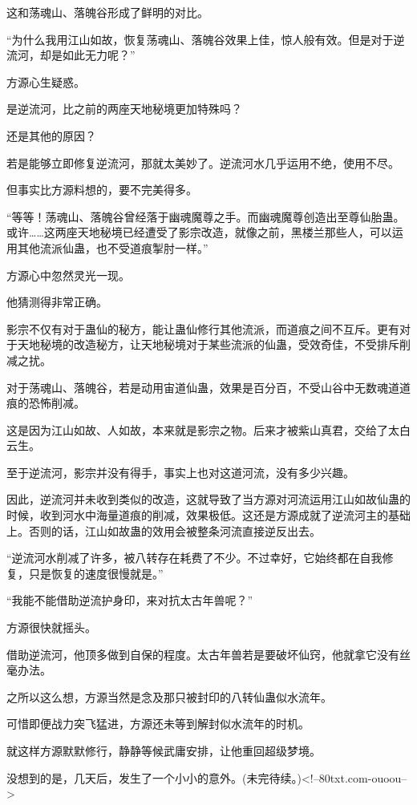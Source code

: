 \begin{this_body}
这和荡魂山、落魄谷形成了鲜明的对比。

“为什么我用江山如故，恢复荡魂山、落魄谷效果上佳，惊人般有效。但是对于逆流河，却是如此无力呢？”

方源心生疑惑。

是逆流河，比之前的两座天地秘境更加特殊吗？

还是其他的原因？

若是能够立即修复逆流河，那就太美妙了。逆流河水几乎运用不绝，使用不尽。

但事实比方源料想的，要不完美得多。

“等等！荡魂山、落魄谷曾经落于幽魂魔尊之手。而幽魂魔尊创造出至尊仙胎蛊。或许……这两座天地秘境已经遭受了影宗改造，就像之前，黑楼兰那些人，可以运用其他流派仙蛊，也不受道痕掣肘一样。”

方源心中忽然灵光一现。

他猜测得非常正确。

影宗不仅有对于蛊仙的秘方，能让蛊仙修行其他流派，而道痕之间不互斥。更有对于天地秘境的改造秘方，让天地秘境对于某些流派的仙蛊，受效奇佳，不受排斥削减之扰。

对于荡魂山、落魄谷，若是动用宙道仙蛊，效果是百分百，不受山谷中无数魂道道痕的恐怖削减。

这是因为江山如故、人如故，本来就是影宗之物。后来才被紫山真君，交给了太白云生。

至于逆流河，影宗并没有得手，事实上也对这道河流，没有多少兴趣。

因此，逆流河并未收到类似的改造，这就导致了当方源对河流运用江山如故仙蛊的时候，收到河水中海量道痕的削减，效果极低。这还是方源成就了逆流河主的基础上。否则的话，江山如故蛊的效用会被整条河流直接逆反出去。

“逆流河水削减了许多，被八转存在耗费了不少。不过幸好，它始终都在自我修复，只是恢复的速度很慢就是。”

“我能不能借助逆流护身印，来对抗太古年兽呢？”

方源很快就摇头。

借助逆流河，他顶多做到自保的程度。太古年兽若是要破坏仙窍，他就拿它没有丝毫办法。

之所以这么想，方源当然是念及那只被封印的八转仙蛊似水流年。

可惜即便战力突飞猛进，方源还未等到解封似水流年的时机。

就这样方源默默修行，静静等候武庸安排，让他重回超级梦境。

没想到的是，几天后，发生了一个小小的意外。(未完待续。)<!--80txt.com-ouoou-->

\end{this_body}

